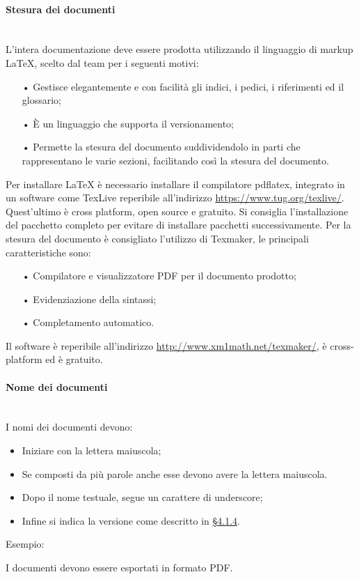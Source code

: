 \paragraph{Stesura dei documenti}\mbox{}\\
L'intera documentazione deve essere prodotta utilizzando il {linguaggio di markup} \LaTeX{}, scelto dal team per i seguenti motivi:
\begin{itemize}
\item[•] Gestisce elegantemente e con facilità gli indici, i pedici, i riferimenti ed il glossario;
\item[•] È un linguaggio che supporta il {versionamento};
\item[•] Permette la stesura del documento suddividendolo in parti che rappresentano le varie sezioni, facilitando così la stesura del documento.
\end{itemize}
Per installare \LaTeX{} è necessario installare il compilatore pdflatex, integrato in un software come TexLive reperibile all'indirizzo \url{https://www.tug.org/texlive/}. Quest'ultimo è {cross platform}, {open source} e gratuito. Si consiglia l'installazione del pacchetto completo per evitare di installare pacchetti successivamente.
Per la stesura del documento è consigliato l'utilizzo di Texmaker, le principali caratteristiche sono:
\begin{itemize}
	\item[•] Compilatore e visualizzatore {PDF} per il documento prodotto;
	\item[•] Evidenziazione della sintassi;
	\item[•] Completamento automatico.
\end{itemize}  
Il software è reperibile all'indirizzo \url{http://www.xm1math.net/texmaker/}, è cross-platform ed è gratuito.

\paragraph{Nome dei documenti}\mbox{}\\
I nomi dei documenti devono:
\begin{itemize}
\item Iniziare con la lettera maiuscola;
\item Se composti da più parole anche esse devono avere la lettera maiuscola.
\item Dopo il nome testuale, segue un carattere di underscore;
\item Infine si indica la versione come descritto in \hyperref[sec:documentversion]{§4.1.4}.
\end{itemize}
Esempio:
\begin{center}
\end{center}
I documenti devono essere esportati in formato PDF.
